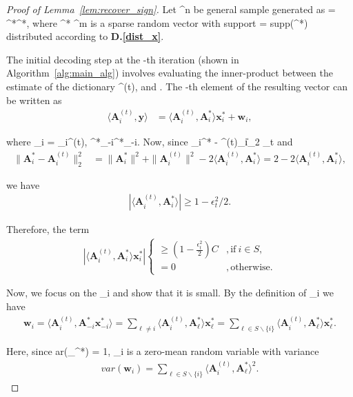 \documentclass{article}
\newcommand{\supp}{{\rm supp}}
\def\[#1\]{{$#1$}}
\def\b#1{{\mathbf{#1}}}
\begin{document}
\begin{proof}[Proof of Lemma~\ref{lem:recover_sign}]
	Let \[\b{y} \in {}^{n}\] be general sample generated as \[\b{y} = \b{A}^*\b{x}^*\], where \[\b{x}^* \in {}^{m}\] is a sparse random vector with support \[S = \supp(\b{x}^*)\] distributed according to \textbf{D.\ref{dist_x}}.
	
	The initial decoding step at the \[t\]-th iteration (shown in Algorithm~\ref{alg:main_alg}) involves evaluating the inner-product between the estimate of the dictionary \[\b{A}^{(t)}\], and \[\b{y}\]. The \[i\]-th element of the resulting vector can be written as
	\begin{align*}
	\langle \b{A}_i^{(t)}, \b{y}\rangle &= 	
	\langle \b{A}_i^{(t)}, \b{A}^*_i \rangle \b{x}^*_i + \b{w}_i,
	\end{align*}
	
	where \[\b{w}_i =  \langle \b{A}_i^{(t)}, \b{A}^*_{-i}\b{x}^*_{-i}\rangle \]. Now, since \[\|\b{A}_i^* - \b{A}^{(t)}_i\|_2 \leq \epsilon_t\] and
	\begin{align*}
	\|\b{A}_i^* - \b{A}^{(t)}_i\|_2^2 &= \|\b{A}_i^* \|^2 +  \|\b{A}^{(t)}_i\|^2 - 2\langle \b{A}^{(t)}_i, \b{A}^*_i \rangle = 2 - 2\langle \b{A}_i^{(t)}, \b{A}^*_i \rangle,
	\end{align*}
	
	we have
	\begin{align*}
	|\langle \b{A}^{(t)}_i, \b{A}^*_i \rangle| \geq 1 - \epsilon^2_t/2.
	\end{align*}
	
	Therefore, the term 
	\begin{align*}
	|\langle \b{A}_i^{(t)}, \b{A}^*_i\rangle \b{x}^*_i| 
	\begin{cases}
		\geq (1 - \tfrac{\epsilon_t^2}{2})C &,  \text{if} ~ i \in S,\\
		= 0&,  \text{otherwise}.
	\end{cases}
	\end{align*}
	

	Now, we focus on the \[\b{w}_i\] and show that it is small. 
	By the definition of \[\b{w}_i\] we have
	\begin{align*}
	\b{w}_i = \langle \b{A}_i^{(t)}, \b{A}^*_{-i}\b{x}^*_{-i}\rangle  = \textstyle\sum\limits_{\ell\neq i}\langle \b{A}^{(t)}_i, \b{A}^*_\ell \rangle \b{x}^*_\ell = \textstyle\sum\limits_{\ell \in S\backslash \{i\}}\langle \b{A}^{(t)}_i, \b{A}^*_\ell \rangle \b{x}^*_\ell.
	\end{align*}
	
	Here, since \[var(\b{x}_\ell^*) = 1\], \[\b{w}_i\] is a zero-mean random variable with variance
	\begin{align*}
	var(\b{w}_i) = \textstyle\sum\limits_{\ell \in S\backslash \{i\}}\langle \b{A}^{(t)}_i, \b{A}^*_\ell \rangle^2.
	\end{align*}
	


\end{proof}
\end{document}
